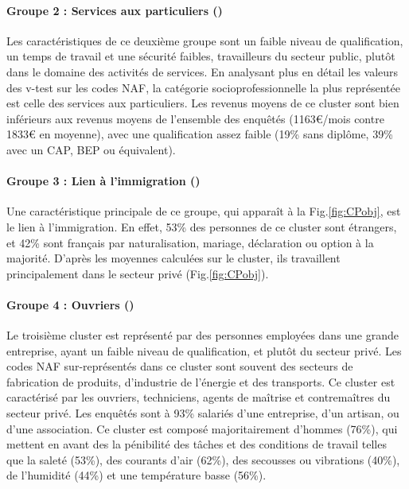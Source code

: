 \documentclass[11pt,fleqn,openany,frenchb]{book} %
\begin{document}
\paragraph{Groupe 2 : Services aux particuliers (\SERV)\\}
Les caractéristiques de ce deuxième groupe sont un faible niveau de qualification, un temps de travail et une sécurité faibles, travailleurs du secteur public, plutôt dans le domaine des activités de services. En analysant plus en détail les valeurs des v-test sur les codes NAF, la catégorie socioprofessionnelle la plus représentée est celle des services aux particuliers. Les revenus moyens de ce cluster sont bien inférieurs aux revenus moyens de l'ensemble des enquêtés (1163\euro{}/mois contre 1833\euro{} en moyenne), avec une qualification assez faible (19\% sans diplôme, 39\% avec un CAP, BEP ou équivalent).

\paragraph{Groupe 3 : Lien à l'immigration (\IMM)\\ }
Une caractéristique principale de ce groupe, qui apparaît à la Fig.\ref{fig:CPobj}, est le lien à l'immigration. En effet, 53\% des personnes de ce cluster sont étrangers, et 42\% sont français par naturalisation, mariage, déclaration ou option à la majorité. D'après les moyennes calculées sur le cluster, ils travaillent principalement dans le secteur privé (Fig.\ref{fig:CPobj}).

\paragraph{Groupe 4 : Ouvriers (\OUVR)\\}
Le troisième cluster est représenté par des personnes employées dans une grande entreprise, ayant un faible niveau de qualification, et plutôt du secteur privé. Les codes NAF sur-représentés dans ce cluster sont souvent des secteurs de fabrication de produits, d'industrie de l'énergie et des transports. Ce cluster est caractérisé par les ouvriers, techniciens, agents de maîtrise et contremaîtres du secteur privé. Les enquêtés sont à 93\% salariés d'une entreprise, d'un artisan, ou d'une association. Ce cluster est composé majoritairement d'hommes (76\%), qui mettent en avant des la pénibilité des tâches et des conditions de travail telles que la saleté (53\%), des courants d'air (62\%), des secousses ou vibrations (40\%), de l'humidité (44\%) et une température basse (56\%). 
\end{document}
